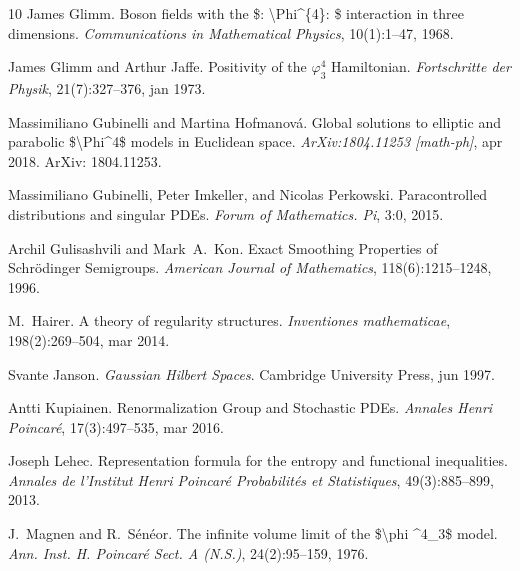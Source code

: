 \documentclass[11pt, oneside]{article}   	%
\newcommand{\tmtextit}[1]{{\itshape{#1}}}
\begin{document}
\begin{thebibliography}{10}
  James Glimm. {\newblock}Boson fields with the
  \$: \textbackslash Phi{\textasciicircum}\{4\}: \$ interaction in three
  dimensions. {\newblock}\tmtextit{Communications in Mathematical Physics},
  10(1):1--47, 1968.{\newblock}
  
  James Glimm  and  Arthur Jaffe.
  {\newblock}Positivity of the ${\varphi}_3^4$ Hamiltonian.
  {\newblock}\tmtextit{Fortschritte der Physik}, 21(7):327--376, jan
  1973.{\newblock}
  
  Massimiliano Gubinelli  and  Martina
  Hofmanov{\'a}. {\newblock}Global solutions to elliptic and parabolic
  \$\textbackslash Phi{\textasciicircum}4\$ models in Euclidean space.
  {\newblock}\tmtextit{ArXiv:1804.11253 [math-ph]}, apr 2018.
  {\newblock}ArXiv: 1804.11253.{\newblock}
  
  Massimiliano Gubinelli, Peter
  Imkeller, and  Nicolas Perkowski. {\newblock}Paracontrolled distributions
  and singular PDEs. {\newblock}\tmtextit{Forum of Mathematics. Pi}, 3:0,
  2015.{\newblock}
  
  Archil Gulisashvili  and  Mark~A.~Kon.
  {\newblock}Exact Smoothing Properties of Schr{\"o}dinger Semigroups.
  {\newblock}\tmtextit{American Journal of Mathematics}, 118(6):1215--1248,
  1996.{\newblock}
  
  M.~Hairer. {\newblock}A theory of regularity
  structures. {\newblock}\tmtextit{Inventiones mathematicae}, 198(2):269--504,
  mar 2014.{\newblock}
  
  Svante Janson.
  {\newblock}\tmtextit{Gaussian Hilbert Spaces}. {\newblock}Cambridge
  University Press, jun 1997.{\newblock}
  
  Antti Kupiainen.
  {\newblock}Renormalization Group and Stochastic PDEs.
  {\newblock}\tmtextit{Annales Henri Poincar{\'e}}, 17(3):497--535, mar
  2016.{\newblock}
  
  Joseph Lehec.
  {\newblock}Representation formula for the entropy and functional
  inequalities. {\newblock}\tmtextit{Annales de l'Institut Henri Poincar{\'e}
  Probabilit{\'e}s et Statistiques}, 49(3):885--899, 2013.{\newblock}
  
  J.~Magnen  and  R.~S{\'e}n{\'e}or.
  {\newblock}The infinite volume limit of the \$\textbackslash phi
  {\textasciicircum}4\_3\$ model. {\newblock}\tmtextit{Ann. Inst. H.
  Poincar{\'e} Sect. A (N.S.)}, 24(2):95--159, 1976.{\newblock}
  

\end{thebibliography}
\end{document}
